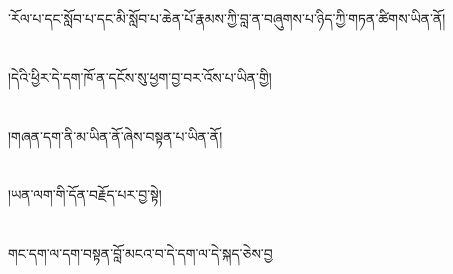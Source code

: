 ་རོལ་པ་དང་སློབ་པ་དང་མི་སློབ་པ་ཆེན་པོ་རྣམས་ཀྱི་བླ་ན་བཞུགས་པ་ཉིད་ཀྱི་གཏན་ཚིགས་ཡིན་ནོ།\chapter{ }།དེའི་ཕྱིར་དེ་དག་ཁོ་ན་དངོས་སུ་ཕྱག་བྱ་བར་འོས་པ་ཡིན་གྱི།\chapter{ }།གཞན་དག་ནི་མ་ཡིན་ནོ་ཞེས་བསྟན་པ་ཡིན་ནོ།\chapter{ }།ཡན་ལག་གི་དོན་བརྗོད་པར་བྱ་སྟེ།\chapter{ }གང་དག་ལ་དག་བསྟན་བློ་མངའ་བ་དེ་དག་ལ་དེ་སྐད་ཅེས་བྱ
